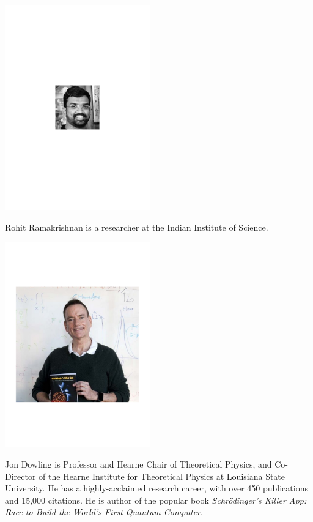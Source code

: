 %
%

\begin{center}
\includegraphics[width=0.47\textwidth]{photo_rohit_ramakrishnan}
\end{center}

Rohit Ramakrishnan is a researcher at the Indian Institute of Science.


%
%

\begin{center}
\includegraphics[width=0.47\textwidth]{photo_jon_dowling}
\end{center}

Jon Dowling is Professor and Hearne Chair of Theoretical Physics, and Co-Director of the Hearne Institute for Theoretical Physics at Louisiana State University. He has a highly-acclaimed research career, with over 450 publications and 15,000 citations. He is author of the popular book \textit{Schr\"odinger's Killer App: Race to Build the World's First Quantum Computer}.

